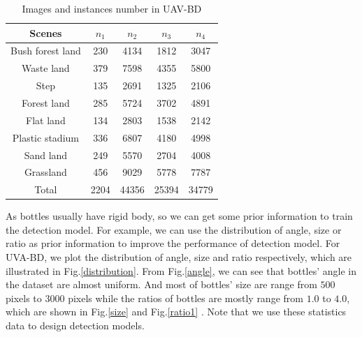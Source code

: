 \begin{table}
	\centering
	\small
	\caption{Images and instances number in UAV-BD}
	\label{statistics}
	\begin{tabular}{@{}ccc|cc@{}}
		\toprule
		Scenes     & $n_1$& $n_2$ & $n_3$ & $n_4$  \\ \midrule
		Bush forest land       & 230  & 4134  & 1812  & 3047  \\
		Waste land     & 379  & 7598  & 4355  & 5800  \\
		Step       & 135  & 2691  & 1325  & 2106  \\
		Forest land    & 285  & 5724  & 3702  & 4891  \\
		Flat land       & 134  & 2803  & 1538  & 2142  \\
		Plastic stadium & 336  & 6807  & 4180  & 4998  \\
		Sand land       & 249  & 5570  & 2704  & 4008  \\
		Grassland       & 456  & 9029  & 5778  & 7787  \\ \midrule
		Total      & 2204 & 44356 & 25394 & 34779 \\ \bottomrule
	\end{tabular}
\end{table}


As bottles usually have rigid body, so we can get some prior information to train the detection model. For example, we can use the distribution of angle, size or ratio as prior information to improve the performance of detection model. For UVA-BD, we plot the distribution of angle, size and ratio respectively, which are illustrated in Fig.\ref{distribution}. From Fig.\ref{angle}, we can see that bottles' angle in the dataset are almost uniform. And most of bottles' size are range from $500 $  pixels to $ 3000 $ pixels while the ratios of bottles are mostly range from $ 1.0 $ to $ 4.0 $, which are shown in Fig.\ref{size} and Fig.\ref{ratio1} . Note that we use these statistics data to design detection models.


